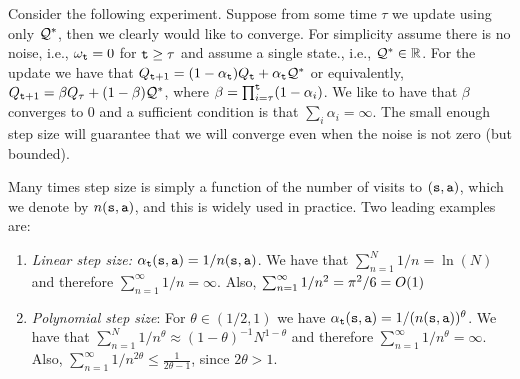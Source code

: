 Consider the following experiment. Suppose from some time $\tau$
we update using only $\mathcal{Q}^*$, then we clearly would like to converge.
For simplicity assume there is no noise, i.e., $\omega_{\tt t}=0$ for
${\tt t}\geq\tau$ and assume a single state., i.e., $\mathcal{Q}^*\in \mathbb{R}$.
For the update we have that $Q_{{\tt t}+1}=(1-\alpha_{\tt t})Q_{\tt t}
+\alpha_{\tt t} \mathcal{Q}^*$ or equivalently, $Q_{{\tt t}+1}=\beta
Q_\tau+(1-\beta)\mathcal{Q}^*$, where $\beta=
\prod_{i=\tau}^{\tt t}(1-\alpha_i)$. We like to have that $\beta$
converges to $0$ and a sufficient condition is that
$\sum_i\alpha_i=\infty$.
%
%
%
The small enough step size will guarantee that we will converge even
when the noise is not zero (but bounded).

Many times step size is simply a function of the number of visits
to $({\tt s},{\tt a})$, which we denote by $n({\tt s},{\tt a})$, and
this is widely used in practice. Two leading examples are:
\begin{enumerate}
\item
{\em Linear step size:}
$\alpha_{\tt t}({\tt s},{\tt a})=1/n({\tt s},{\tt a})$. We have that
$\sum_{n=1}^N 1/n=\ln(N)$ and therefore $\sum_{n=1}^\infty
1/n=\infty$. Also, $\sum_{n=1}^\infty 1/n^2=\pi^2/6=O(1)$
\item
{\em Polynomial step size}: For $\theta\in(1/2,1)$ we have
$\alpha_{\tt t}({\tt s},{\tt a})=1/(n({\tt s},{\tt a}))^\theta$. We
have that $\sum_{n=1}^N 1/n^\theta\approx
(1-\theta)^{-1}N^{1-\theta}$ and therefore $\sum_{n=1}^\infty
1/n^\theta=\infty$. Also, $\sum_{n=1}^\infty 1/n^{2\theta} \leq
\frac{1}{2\theta-1}$, since $2\theta>1$.
\end{enumerate}

